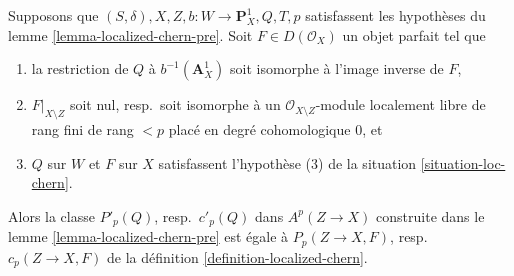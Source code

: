 \begin{lemma}
\label{lemma-independent-loc-chern-bQ}
Supposons que $(S, \delta), X, Z, b : W \to \mathbf{P}^1_X, Q, T, p$
satisfassent les hypothèses du lemme \ref{lemma-localized-chern-pre}.
Soit $F \in D(\mathcal{O}_X)$ un objet parfait tel que
\begin{enumerate}
\item la restriction de $Q$ à $b^{-1}(\mathbf{A}^1_X)$ soit
isomorphe à l'image inverse de $F$,
\item $F|_{X \setminus Z}$ soit nul, resp.\ soit isomorphe à un
$\mathcal{O}_{X \setminus Z}$-module localement libre de rang fini de rang $< p$
placé en degré cohomologique $0$, et
\item $Q$ sur $W$ et $F$ sur $X$ satisfassent l'hypothèse (3) de la
situation \ref{situation-loc-chern}.
\end{enumerate}
Alors la classe $P'_p(Q)$, resp.\ $c'_p(Q)$ dans $A^p(Z \to X)$ construite
dans le lemme \ref{lemma-localized-chern-pre}
est égale à $P_p(Z \to X, F)$, resp.\ $c_p(Z \to X, F)$
de la définition \ref{definition-localized-chern}.
\end{lemma}

